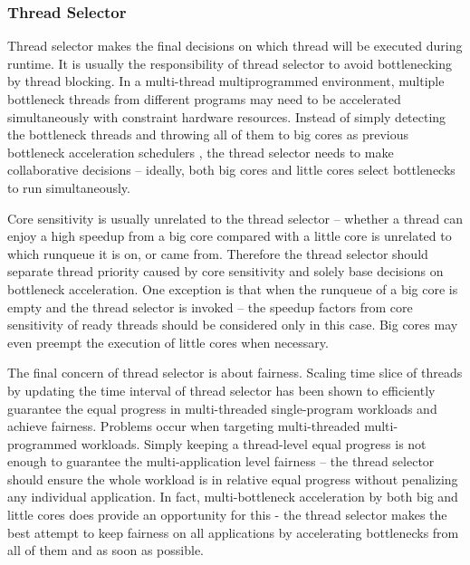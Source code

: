\documentclass[10pt,conference]{IEEEtran}
\begin{document}
\subsubsection{Thread Selector}
Thread selector makes the final decisions on which thread will be executed during runtime. It is usually the responsibility of thread selector to avoid bottlenecking by thread blocking. In a multi-thread multiprogrammed environment, multiple bottleneck threads from different programs may need to be accelerated simultaneously with constraint hardware resources. Instead of simply detecting the bottleneck threads and throwing all of them to big cores as previous bottleneck acceleration schedulers \cite{jibaja2016portable,joao2013utility,joao2012bottleneck}, the thread selector needs to make collaborative decisions -- ideally, both big cores and little cores select bottlenecks to run simultaneously.

Core sensitivity is usually unrelated to the thread selector -- whether a thread can enjoy a high speedup from a big core compared with a little core is unrelated to which runqueue it is on, or came from. Therefore the thread selector should separate thread priority caused by core sensitivity and solely base decisions on bottleneck acceleration. One exception is that when the runqueue of a big core is empty and the thread selector is invoked -- the speedup factors from core sensitivity of ready threads should be considered only in this case. Big cores may even preempt the execution of little cores when necessary.  

The final concern of thread selector is about fairness. Scaling time slice of threads by updating the time interval of thread selector has been shown to efficiently guarantee the equal progress \cite{van2013fairness} in multi-threaded single-program workloads and achieve fairness. 
Problems occur when targeting multi-threaded multi-programmed workloads. Simply keeping a thread-level equal progress is not enough to guarantee the multi-application level fairness -- the thread selector should ensure the whole workload is in relative equal progress without penalizing any individual application. In fact,  multi-bottleneck acceleration by both big and little cores does provide an opportunity for this - the thread selector makes the best attempt to keep fairness on all applications by accelerating bottlenecks from all of them and as soon as possible.
\end{document}

